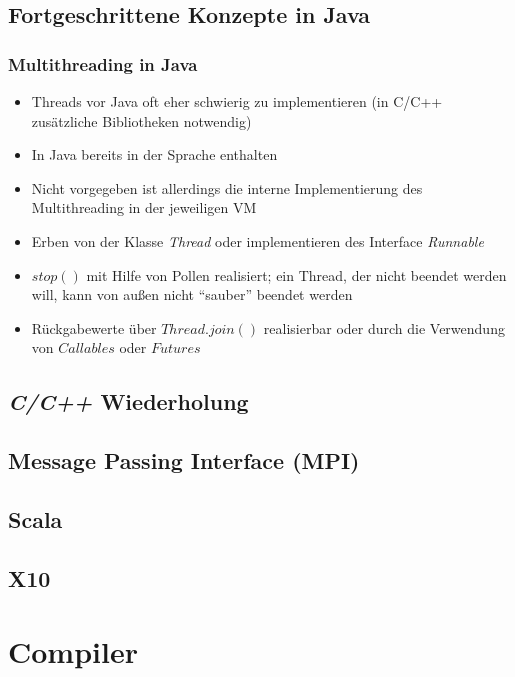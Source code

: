 \subsection{Fortgeschrittene Konzepte in Java}

\subsubsection{Multithreading in Java}
\begin{itemize}
	\item Threads vor Java oft eher schwierig zu implementieren (in C/C++ zusätzliche Bibliotheken notwendig)
	\item In Java bereits in der Sprache enthalten
	\item Nicht vorgegeben ist allerdings die interne Implementierung des Multithreading in der jeweiligen VM
	\item Erben von der Klasse \textit{Thread} oder implementieren des Interface \textit{Runnable}
	\item \(stop()\) mit Hilfe von Pollen realisiert; ein Thread, der nicht beendet werden will, kann von außen nicht "`sauber"' beendet werden
	\item Rückgabewerte über \(Thread.join()\) realisierbar oder durch die Verwendung von \(Callables\) oder \(Futures\)
\end{itemize}


\subsection{\textit{C/C++} Wiederholung}


\subsection{Message Passing Interface (MPI)}


\subsection{Scala}


\subsection{X10}



\section{Compiler}

